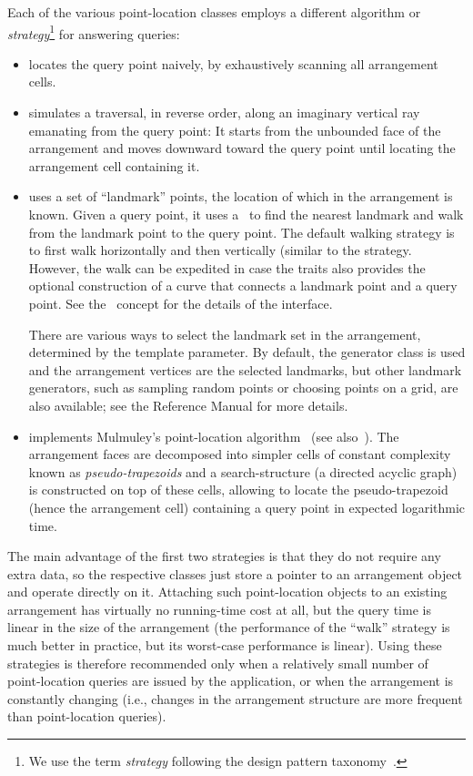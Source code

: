 Each of the various point-location classes employs a different
algorithm or {\em strategy}\footnote{We use the term {\em strategy}
following the design pattern taxonomy~\cite{cgal:ghjv-dpero-95}.}
for answering queries:
\begin{itemize}
\item {} locates the query
point naively, by exhaustively scanning all arrangement cells.
%
\item {}
simulates a traversal, in reverse order, along an imaginary vertical
ray emanating
from the query point: It starts from the unbounded face of the
arrangement and moves downward toward the query point until
locating the arrangement cell containing it.
%
\item {}
uses a set of ``landmark'' points, the location of which in the
arrangement is known.
Given a query point, it uses a \kdtree\ to find the nearest landmark
and walk from the landmark point to the query point.
The default walking strategy is to first walk horizontally and then
vertically (similar to the
 strategy.
However, the walk can be expedited in case the traits also provides
the optional construction of a curve that connects a landmark point
and a query point. See the~ concept
for the details of the interface.

There are various ways to select the landmark set in the
arrangement, determined by the  template parameter.
By default, the generator
class  is used and the
arrangement vertices are the selected landmarks, but other
landmark generators, such as sampling random points or
choosing points on a grid, are also available; see the
Reference Manual for more details.
%
\item {} implements
Mulmuley's point-location algorithm~\cite{m-fppa-90} (see
also~\cite[Chapter~6]{bkos-cgaa-00}). The
arrangement faces are decomposed into simpler cells of constant
complexity known as {\em pseudo-trapezoids} and a search-structure
(a directed acyclic graph) is constructed on top of these cells,
allowing to locate the pseudo-trapezoid (hence the arrangement
cell) containing a query point in expected logarithmic time.
\end{itemize}

The main advantage of the first two strategies is that they do not
require any extra data, so the respective classes just store a
pointer to an arrangement object and operate directly on it.
Attaching such point-location objects to an existing arrangement
has virtually no running-time cost at all, but the query time is
linear in the size of the arrangement (the performance of the
``walk'' strategy is much better in practice, but its worst-case
performance is linear). Using these strategies is therefore
recommended only when a relatively small number of point-location
queries are issued by the application, or when the arrangement is
constantly changing (i.e., changes in the arrangement structure
are more frequent than point-location queries).

